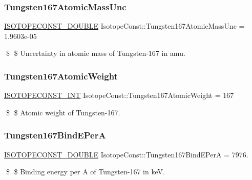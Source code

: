 \subsubsection{\texorpdfstring{Tungsten167\+Atomic\+Mass\+Unc}{Tungsten167AtomicMassUnc}}
{\footnotesize\ttfamily \mbox{\hyperlink{group___isotope_const-_macros_ga8f45a7272ce02c0b4c65c44636ed719a}{I\+S\+O\+T\+O\+P\+E\+C\+O\+N\+S\+T\+\_\+\+D\+O\+U\+B\+LE}} Isotope\+Const\+::\+Tungsten167\+Atomic\+Mass\+Unc = 1.\+9603e-\/05}

\$ \$ Uncertainty in atomic mass of Tungsten-\/167 in amu. \mbox{\label{group___isotope_const-_tungsten-_w167_ga26959663aad461c472a428c2f3cb3898}} 
\subsubsection{\texorpdfstring{Tungsten167\+Atomic\+Weight}{Tungsten167AtomicWeight}}
{\footnotesize\ttfamily \mbox{\hyperlink{group___isotope_const-_macros_ga5f18360b3e99483a35c32d789e62621c}{I\+S\+O\+T\+O\+P\+E\+C\+O\+N\+S\+T\+\_\+\+I\+NT}} Isotope\+Const\+::\+Tungsten167\+Atomic\+Weight = 167}

\$ \$ Atomic weight of Tungsten-\/167. \mbox{\label{group___isotope_const-_tungsten-_w167_ga78fd58ce392f6d53023adcdcad06cc74}} 
\subsubsection{\texorpdfstring{Tungsten167\+Bind\+E\+PerA}{Tungsten167BindEPerA}}
{\footnotesize\ttfamily \mbox{\hyperlink{group___isotope_const-_macros_ga8f45a7272ce02c0b4c65c44636ed719a}{I\+S\+O\+T\+O\+P\+E\+C\+O\+N\+S\+T\+\_\+\+D\+O\+U\+B\+LE}} Isotope\+Const\+::\+Tungsten167\+Bind\+E\+PerA = 7976.}

\$ \$ Binding energy per A of Tungsten-\/167 in keV. \mbox{\label{group___isotope_const-_tungsten-_w167_gae97fc4dd8eb401e602621693d0c7dc2e}} 
